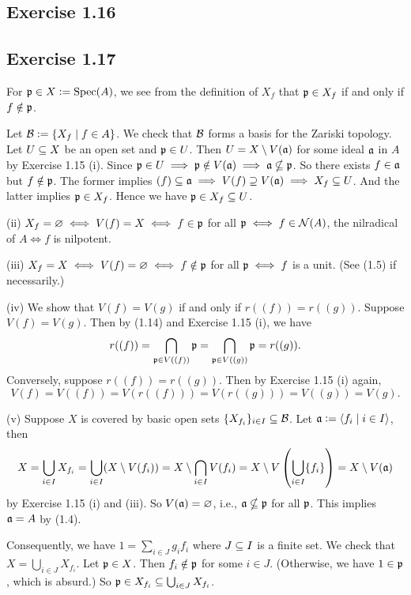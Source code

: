 \documentclass[../A&M.tex]{subfiles}
\begin{document}
\subsection*{Exercise 1.16}

\subsection*{Exercise 1.17}

For $\mathfrak{p}\in X:=\operatorname{Spec}(A)$, we see from the definition of $X_f$ that $\mathfrak{p}\in X_f$ if and only if $f\notin\mathfrak{p}$.

Let $\mathcal{B}:=\{ X_f \mid f\in A\}$. We check that $\mathcal{B}$ forms a basis for the Zariski topology. Let $U\subseteq X$ be an open set and $\mathfrak{p}\in U$. Then $U=X \setminus V(\mathfrak{a})$ for some ideal $\mathfrak{a}$ in $A$ by Exercise 1.15 (i). Since $\mathfrak{p}\in U \implies \mathfrak{p}\notin V(\mathfrak{a}) \implies \mathfrak{a}\nsubseteq\mathfrak{p}$. So there exists $f\in\mathfrak{a}$ but $f\notin\mathfrak{p}$. The former implies $(f)\subseteq\mathfrak{a} \implies V(f)\supseteq V(\mathfrak{a}) \implies X_f \subseteq U$. And the latter implies $\mathfrak{p}\in X_f$. Hence we have $\mathfrak{p} \in X_f \subseteq U$.

(ii) $X_f=\varnothing \iff V(f)=X \iff f\in\mathfrak{p}$ for all $\mathfrak{p} \iff f\in \mathcal{N}(A)$, the nilradical of $A \iff f$ is nilpotent.

(iii) $X_f=X \iff V(f)=\varnothing \iff f\notin\mathfrak{p}$ for all $\mathfrak{p} \iff f$ is a unit. (See (1.5) if necessarily.)

(iv) We show that $V(f)=V(g)$ if and only if $r((f))=r((g))$. Suppose $V(f)=V(g)$. Then by (1.14) and Exercise 1.15 (i), we have
$$
r((f)) = \bigcap_{\mathfrak{p}\in V((f))} \mathfrak{p} = \bigcap_{\mathfrak{p}\in V((g))} \mathfrak{p} = r((g)).
$$
Conversely, suppose $r((f))=r((g))$. Then by Exercise 1.15 (i) again,
$$
V(f) = V((f)) = V(r((f))) = V(r((g))) = V((g)) = V(g).
$$

(v) Suppose $X$ is covered by basic open sets $\{X_{f_i}\}_{i\in I} \subseteq \mathcal{B}$. Let $\mathfrak{a}:=\langle f_i \mid i\in I \rangle$, then
$$
X = \bigcup_{i\in I} X_{f_i} = \bigcup_{i\in I} (X\setminus V(f_i)) = X\setminus  \bigcap_{i\in I} V(f_i) = X \setminus V\left( \bigcup_{i\in I} \{f_i\} \right) = X\setminus V(\mathfrak{a})
$$
by Exercise 1.15 (i) and (iii). So $V(\mathfrak{a})=\varnothing$, i.e., $\mathfrak{a}\nsubseteq\mathfrak{p}$ for all $\mathfrak{p}$. This implies $\mathfrak{a}=A$ by (1.4).

Consequently, we have $1=\sum_{i\in J} g_if_i$ where $J\subseteq I$ is a finite set. We check that $X=\bigcup_{i\in J} X_{f_i}$. Let $\mathfrak{p}\in X$. Then $f_i\notin \mathfrak{p}$ for some $i\in J$. (Otherwise, we have $1\in \mathfrak{p}$, which is absurd.) So $\mathfrak{p}\in X_{f_i} \subseteq \bigcup_{i\in J} X_{f_i}$.
\end{document}
